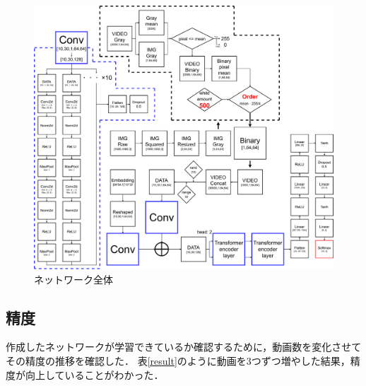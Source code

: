 \begin{figure}[b]
  \begin{center}
    \includegraphics[width=120mm]{images/chart/flowchart.pdf}
  \end{center}
  \caption{ネットワーク全体}
  \label{flowchart}
\end{figure}
\clearpage

\subsection{精度}
作成したネットワークが学習できているか確認するために，動画数を変化させて
その精度の推移を確認した．
表\ref{result}のように動画を3つずつ増やした結果，精度が向上していることがわかった．


